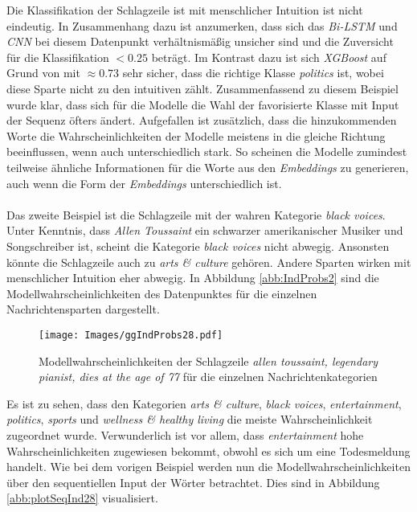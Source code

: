 \documentclass[a4paper,11pt]{article}
\begin{document}
Die Klassifikation der Schlagzeile ist mit menschlicher Intuition ist nicht eindeutig. In Zusammenhang dazu ist anzumerken, dass sich das \textit{Bi-LSTM} und \textit{CNN} bei diesem Datenpunkt verhältnismäßig unsicher sind und die Zuversicht für die Klassifikation $<  0.25$ beträgt. Im Kontrast dazu ist sich \textit{XGBoost} auf Grund von  mit $\approx 0.73$ sehr sicher, dass die richtige Klasse \textit{politics} ist, wobei diese Sparte nicht zu den intuitiven zählt. Zusammenfassend zu diesem Beispiel wurde klar, dass sich für die Modelle die Wahl der favorisierte Klasse mit Input der Sequenz öfters ändert. Aufgefallen ist zusätzlich, dass die hinzukommenden Worte die Wahrscheinlichkeiten der Modelle meistens in die gleiche Richtung beeinflussen, wenn auch unterschiedlich stark. So scheinen die Modelle zumindest teilweise ähnliche Informationen für die Worte aus den \textit{Embeddings} zu generieren, auch wenn die Form der \textit{Embeddings} unterschiedlich ist.\\
\\
Das zweite Beispiel ist die Schlagzeile  mit der wahren Kategorie \textit{black voices}. Unter Kenntnis, dass \textit{Allen Toussaint} ein schwarzer amerikanischer Musiker und Songschreiber ist, scheint die Kategorie \textit{black voices} nicht abwegig. Ansonsten könnte die Schlagzeile auch zu \textit{arts \& culture} gehören. Andere Sparten wirken mit menschlicher Intuition eher abwegig. In Abbildung \ref{abb:IndProbs2} sind die Modellwahrscheinlichkeiten des Datenpunktes für die einzelnen Nachrichtensparten dargestellt.

\begin{figure}[H]
    \centering
\texttt{[image: Images/ggIndProbs28.pdf]} 
\caption{Modellwahrscheinlichkeiten der Schlagzeile \textit{allen toussaint, legendary pianist, dies at the age of 77} für die einzelnen Nachrichtenkategorien}
\label{abb:IndProbs28}
\end{figure}

Es ist zu sehen, dass den Kategorien \textit{arts \& culture}, \textit{black voices}, \textit{entertainment}, \textit{politics}, \textit{sports} und \textit{wellness \& healthy living} die meiste Wahrscheinlichkeit zugeordnet wurde. Verwunderlich ist vor allem, dass \textit{entertainment} hohe Wahrscheinlichkeiten zugewiesen bekommt, obwohl es sich um eine Todesmeldung handelt. Wie bei dem vorigen Beispiel werden nun die Modellwahrscheinlichkeiten über den sequentiellen Input der Wörter betrachtet. Dies sind in Abbildung \ref{abb:plotSeqInd28} visualisiert.
\end{document}
